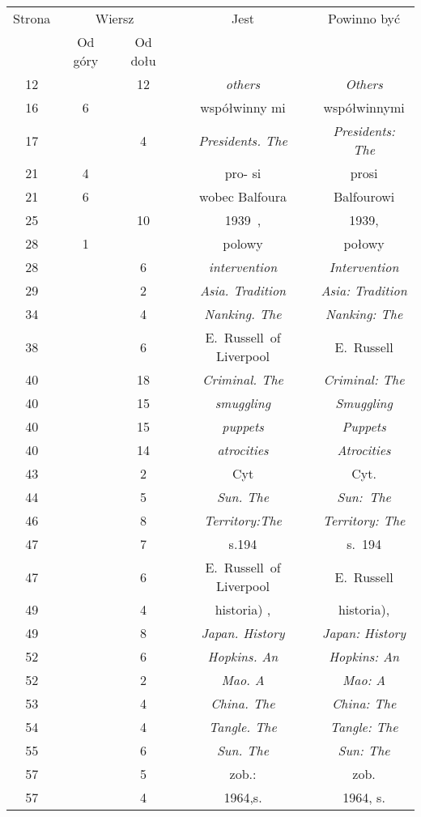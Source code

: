 \documentclass[a4paper,11pt]{article}
\numberwithin{equation}{section}
\begin{document}
\begin{center}
  \begin{tabular}{|c|c|c|c|c|}
    \hline
    Strona & \multicolumn{2}{c|}{Wiersz} & Jest
                              & Powinno być \\ \cline{2-3}
    & Od góry & Od dołu & & \\
    \hline
    12  & & 12 & \textit{others} & \textit{Others} \\
    16  &  6 & & współwinny mi & współwinnymi \\
    17  & &  4 & \textit{Presidents. The} & \textit{Presidents: The} \\
    21  &  4 & & pro- si & prosi \\
    21  &  6 & & wobec Balfoura & Balfourowi \\
    25  & & 10 & 1939~, & 1939, \\
    28  &  1 & & polowy & połowy \\
    28  & &  6 & \textit{intervention} & \textit{Intervention} \\
    29  & &  2 & \textit{Asia. Tradition} & \textit{Asia: Tradition} \\
    34  & &  4 & \textit{Nanking. The} & \textit{Nanking: The} \\
    38  & &  6 & E.~Russell~of Liverpool & E.~Russell \\
    40  & & 18 & \textit{Criminal. The} & \textit{Criminal: The} \\
    40  & & 15 & \textit{smuggling} & \textit{Smuggling} \\
    40  & & 15 & \textit{puppets} & \textit{Puppets} \\
    40  & & 14 & \textit{atrocities} & \textit{Atrocities} \\
    43  & &  2 & Cyt & Cyt. \\
    44  & &  5 & \textit{Sun. The} & \textit{Sun:~The} \\
    46  & &  8 & \textit{Territory:The} & \textit{Territory: The} \\
    47  & &  7 & s.194 & s.~194 \\
    47  & &  6 & E.~Russell~of Liverpool & E.~Russell \\
    49  & &  4 & historia) , & historia), \\
    49  & &  8 & \textit{Japan. History} & \textit{Japan: History} \\
    52  & &  6 & \textit{Hopkins. An} & \textit{Hopkins: An} \\
    52  & &  2 & \textit{Mao. A} & \textit{Mao: A} \\
    53  & &  4 & \textit{China. The} & \textit{China: The} \\
    54  & &  4 & \textit{Tangle. The} & \textit{Tangle: The} \\
    55  & &  6 & \textit{Sun. The} & \textit{Sun: The} \\
    57  & &  5 & zob.: & zob. \\
    57  & &  4 & 1964,s. & 1964, s. \\
    \hline
  \end{tabular}






\end{center}
\end{document}
